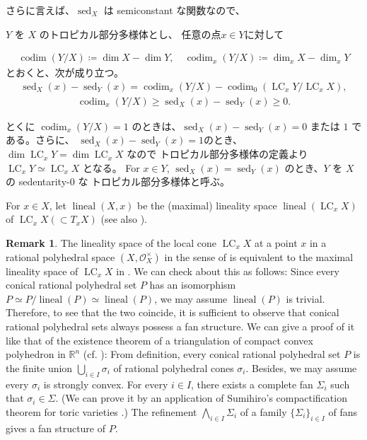 \documentclass[a4paper,dvipdfmx,reqno,12pt]{amsart}
\theoremstyle{definition}
\newtheorem{remark}[theorem]{Remark}
\newcommand{\deq}{\coloneqq}
\newcommand{\opn}[1]{\operatorname{#1}}
\numberwithin{equation}{section}
\begin{document}
さらに言えば、$\opn{sed}_X$ は
semiconstant な関数なので、




$Y$ を $X$ 
のトロピカル部分多様体とし、
任意の点$x\in Y$に対して

\begin{align}
\opn{codim}(Y/X)\deq \dim X -\dim Y,\quad 
\opn{codim}_x(Y/X)\deq \dim_x X -\dim_x Y
\end{align}
とおくと、次が成り立つ。
\begin{align}
\opn{sed}_X(x)-\opn{sed}_Y(x)=
\opn{codim}_x(Y/X)-\opn{codim}_0(\opn{LC}_x Y/\opn{LC}_xX),
\end{align}
\begin{align}
\opn{codim}_x(Y/X) \geq 
\opn{sed}_X(x)-\opn{sed}_Y(x)\geq 0.
\end{align}

とくに $\opn{codim}_x(Y/X)=1$
のときは、$\opn{sed}_X(x)-\opn{sed}_Y(x)=0$ または
$1$ である。さらに、
$\opn{sed}_X(x)-\opn{sed}_Y(x)=1$のとき、
$\dim \opn{LC}_x Y=\dim \opn{LC}_x X$
なので トロピカル部分多様体の定義より
$\opn{LC}_x Y\simeq \opn{LC}_x X$
となる。
For $x\in Y$,
$\opn{sed}_X(x)=\opn{sed}_Y(x)$ 
のとき、$Y$ を $X$ の sedentarity-0 な
トロピカル部分多様体と呼ぶ。 

For $x\in X$, let 
$\opn{lineal}(X,x)$ be the (maximal) lineality space
$\opn{lineal}(\opn{LC}_x X)$ of 
$\opn{LC}_x X (\subset T_x X)$ \cite[]{MR4246795}
(see also \cite[]{demedrano2023chern}).



\begin{remark}
The lineality space of the local cone $\opn{LC}_x X$
at a point $x$ in a rational polyhedral space
$(X,\mathcal{O}_X^{\times})$ in the sense of 
\cite[]{MR4246795}
is equivalent to
the maximal lineality space of $\opn{LC}_x X$ in
\cite[]{MR3041763}.
We can check about this as follows:
Since every conical rational polyhedral set $P$ has an isomorphism
$P\simeq P/\opn{lineal}(P)\simeq \opn{lineal}(P)$, we
may assume $\opn{lineal}(P)$ is trivial.
Therefore, to see that the two coincide,
it is sufficient to observe that 
conical rational polyhedral sets
always possess a fan structure.
We can give a proof of it like
that of the existence theorem
of a triangulation of compact convex polyhedron
in $\mathbb{R}^{n}$ (cf. \cite[Theorem 2.11]{MR665919}):
From definition, every conical rational polyhedral set $P$
is the finite union $\bigcup_{i\in I}\sigma_i$ of 
rational polyhedral cones $\sigma_i$.
Besides, we may assume every $\sigma_i$ is strongly convex.
For every $i\in I$, there exists a
complete fan $\Sigma_i$ such that $\sigma_i\in\Sigma$.
(We can prove it by an application of Sumihiro's
compactification theorem for toric varieties
\cite[Theorem 3]{MR337963}.)
The refinement $\bigwedge_{i\in I}\Sigma_i$
of a family $\{\Sigma_i\}_{i\in I}$ of fans gives
a fan structure of $P$.
\end{remark}
\end{document}
